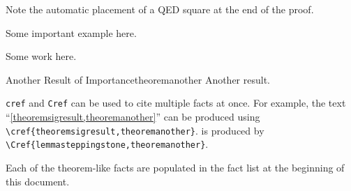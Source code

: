 Note the automatic placement of a QED square at the end of the proof.

\begin{example}{}{}
    Some important example here.

    Some work here.
\end{example}

\begin{theorem}{Another Result of Importance}{theoremanother}
    Another result.
\end{theorem}

\begin{remark}{}{}
    \verb|cref| and \verb|Cref| can be used to cite multiple facts at once. For example, the text
    ``\cref{theoremsigresult,theoremanother}'' can be produced using \verb|\cref{theoremsigresult,theoremanother}|.
     is produced by \verb|\Cref{lemmasteppingstone,theoremanother}|.
\end{remark}

Each of the theorem-like facts are populated in the fact list at the beginning of this document.
